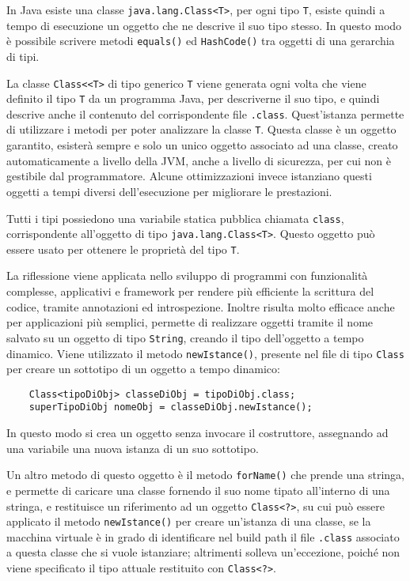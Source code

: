\documentclass{article}
\numberwithin{equation}{subsection}
\begin{document}
In Java esiste una classe \verb|java.lang.Class<T>|,  per ogni tipo \verb|T|, esiste quindi a tempo di esecuzione un oggetto che ne descrive il suo tipo stesso. 
In questo modo è possibile scrivere metodi \verb|equals()| ed \verb|HashCode()| tra oggetti di una gerarchia di tipi. 

La classe \verb|Class<<T>| di tipo generico \verb|T| viene generata ogni volta che viene definito il tipo \verb|T| da un programma Java, per descriverne il suo tipo, e quindi 
descrive anche il contenuto del corrispondente file \verb|.class|. 
Quest'istanza permette di utilizzare i metodi per poter analizzare la classe \verb|T|. 
Questa classe è un oggetto garantito, esisterà sempre e solo un unico oggetto associato ad una classe, creato automaticamente a livello della JVM, anche a livello di sicurezza, 
per cui non è gestibile dal programmatore. 
Alcune ottimizzazioni invece istanziano questi oggetti a tempi diversi dell'esecuzione per migliorare le prestazioni. 

Tutti i tipi possiedono una variabile statica pubblica chiamata \verb|class|, corrispondente all'oggetto di tipo \verb|java.lang.Class<T>|. 
Questo oggetto può essere usato per ottenere le proprietà del tipo \verb|T|. 


La riflessione viene applicata nello sviluppo di programmi con funzionalità complesse, applicativi e framework per rendere più efficiente la scrittura del codice, tramite 
annotazioni ed introspezione. 
Inoltre risulta molto efficace anche per applicazioni più semplici, permette di realizzare oggetti tramite il nome salvato su un oggetto di tipo \verb|String|, 
creando il tipo dell'oggetto a tempo dinamico. Viene utilizzato il metodo \verb|newIstance()|, presente nel file di tipo \verb|Class| per creare un sottotipo di un 
oggetto a tempo dinamico: 
\begin{verbatim}
    Class<tipoDiObj> classeDiObj = tipoDiObj.class;
    superTipoDiObj nomeObj = classeDiObj.newIstance(); 
\end{verbatim}
In questo modo si crea un oggetto senza invocare il costruttore, assegnando ad una variabile una nuova istanza di un suo sottotipo. 

Un altro metodo di questo oggetto è il metodo \verb|forName()| che prende una stringa, e permette di caricare una classe fornendo il suo nome tipato all'interno di una stringa, 
e restituisce un riferimento ad un oggetto \verb|Class<?>|, su cui può essere applicato il metodo \verb|newIstance()| per creare un'istanza di una classe, se la macchina virtuale 
è in grado di identificare nel build path il file \verb|.class| associato a questa classe che si vuole istanziare; altrimenti solleva un'eccezione, poiché non viene specificato il 
tipo attuale restituito con \verb|Class<?>|. 
\end{document}
